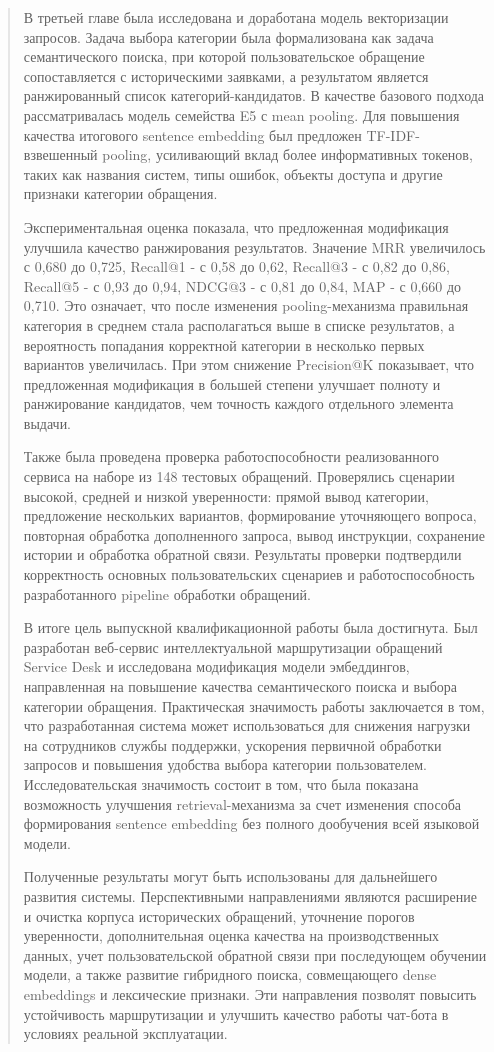 \documentclass[
]{article}
\begin{document}
\begin{quote}
В третьей главе была исследована и доработана модель векторизации
запросов. Задача выбора категории была формализована как задача
семантического поиска, при которой пользовательское обращение
сопоставляется с историческими заявками, а результатом является
ранжированный список категорий-кандидатов. В качестве базового подхода
рассматривалась модель семейства E5 с mean pooling. Для повышения
качества итогового sentence embedding был предложен TF-IDF-взвешенный
pooling, усиливающий вклад более информативных токенов, таких как
названия систем, типы ошибок, объекты доступа и другие признаки
категории обращения.

Экспериментальная оценка показала, что предложенная модификация улучшила
качество ранжирования результатов. Значение MRR увеличилось с 0,680 до
0,725, Recall@1 - с 0,58 до 0,62, Recall@3 - с 0,82 до 0,86, Recall@5 -
с 0,93 до 0,94, NDCG@3 - с 0,81 до 0,84, MAP - с 0,660 до 0,710. Это
означает, что после изменения pooling-механизма правильная категория в
среднем стала располагаться выше в списке результатов, а вероятность
попадания корректной категории в несколько первых вариантов увеличилась.
При этом снижение Precision@K показывает, что предложенная модификация в
большей степени улучшает полноту и ранжирование кандидатов, чем точность
каждого отдельного элемента выдачи.

Также была проведена проверка работоспособности реализованного сервиса
на наборе из 148 тестовых обращений. Проверялись сценарии высокой,
средней и низкой уверенности: прямой вывод категории, предложение
нескольких вариантов, формирование уточняющего вопроса, повторная
обработка дополненного запроса, вывод инструкции, сохранение истории и
обработка обратной связи. Результаты проверки подтвердили корректность
основных пользовательских сценариев и работоспособность разработанного
pipeline обработки обращений.

В итоге цель выпускной квалификационной работы была достигнута. Был
разработан веб-сервис интеллектуальной маршрутизации обращений Service
Desk и исследована модификация модели эмбеддингов, направленная на
повышение качества семантического поиска и выбора категории обращения.
Практическая значимость работы заключается в том, что разработанная
система может использоваться для снижения нагрузки на сотрудников службы
поддержки, ускорения первичной обработки запросов и повышения удобства
выбора категории пользователем. Исследовательская значимость состоит в
том, что была показана возможность улучшения retrieval-механизма за счет
изменения способа формирования sentence embedding без полного дообучения
всей языковой модели.

Полученные результаты могут быть использованы для дальнейшего развития
системы. Перспективными направлениями являются расширение и очистка
корпуса исторических обращений, уточнение порогов уверенности,
дополнительная оценка качества на производственных данных, учет
пользовательской обратной связи при последующем обучении модели, а также
развитие гибридного поиска, совмещающего dense embeddings и лексические
признаки. Эти направления позволят повысить устойчивость маршрутизации и
улучшить качество работы чат-бота в условиях реальной эксплуатации.
\end{quote}
\end{document}
